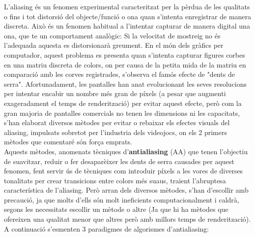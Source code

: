 \documentclass[12pt]{article}
\begin{document}
L'aliasing és un fenomen experimental caracteritzat per la pèrdua de les qualitats o fins i tot distorsió del objecte/funció o ona quan s'intenta enregistrar de manera discreta. Això és un fenomen habitual a l'intentar capturar de manera digital una ona, que te un comportament analògic: Si la velocitat de mostreig no és l'adequada aquesta es distorsionarà greument. En el món dels gràfics per computador, aquest problema es presenta quan s'intenta capturar figures corbes en una matriu discreta de colors, on  per causa de la petita mida de la matriu en comparació amb les corves registrades, s'observa el famós efecte de "dents de serra". Afortunadament, les pantalles han anat evolucionant les seves resolucions per intentar encabir un nombre més gran de píxels (a pesar que augmenti exageradament el temps de renderització) per evitar aquest efecte, però com la gran majoria de pantalles comercials no tenen les dimensions ni les capacitats, s'han elaborat diversos mètodes per evitar o rebaixar els efectes visuals del aliasing, impulsats sobretot per l'industria dels videojocs, on els 2 primers mètodes que comentaré són força emprats.
\\ 

Aquests mètodes, anomenats tècniques d'\textbf{antialiasing} (AA) que tenen l'objectiu de suavitzar, reduir o fer desaparèixer les dents de serra causades per aquest fenomen, fent servir ús de tècniques com introduir píxels a les vores de diverses tonalitats per crear transicions entre colors més suaus, traient l'abruptesa característica de l'aliasing. Però arran dels diversos mètodes, s'han d'escollir amb precaució, ja que molts d'ells són molt ineficients computacionalment i caldrà, segons les necessitats escollir un mètode o altre (Ja que hi ha mètodes que ofereixen una qualitat menor que altres però amb millors temps de renderització). A continuació s'esmenten 3 paradigmes de algorismes d'antialiasing:
\end{document}
